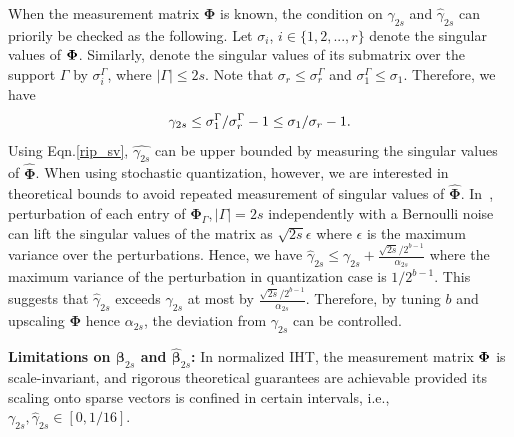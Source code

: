 \documentclass{article}
\begin{document}
When the measurement matrix $\boldsymbol{\Phi}$ is known, the condition on $\gamma_{2s}$ and $\hat{\gamma}_{2s}$ can priorily be checked as the following. Let $\sigma_i$, $i \in \{1, 2, ..., r \}$ denote the singular values of ${\bf \Phi}$. Similarly, denote the singular values of its submatrix over the support ${\Gamma}$ by $\sigma_i^{\Gamma}$, where $|\Gamma|\leq 2s$. Note that $\sigma_r \leq \sigma_r^{\Gamma}$ and $\sigma_1^{\Gamma} \leq \sigma_1$. Therefore, we have
\begin{equation}\label{rip_sv}
\small
    \gamma_{2s} \leq \sigma_1^{\Gamma}/\sigma_r^{\Gamma}-1 \leq \sigma_1/\sigma_r-1.
\end{equation}
Using Eqn.\ref{rip_sv}, $\hat{\gamma_{2s}}$ can be upper bounded
by measuring the singular values of $\hat{\boldsymbol{\Phi}}$. When using stochastic quantization, however, we are interested in theoretical bounds to avoid repeated measurement of singular values of $\hat{\boldsymbol{\Phi}}$. In~\cite{Steawart1990perturbation}, perturbation of each entry of $\boldsymbol{\Phi}_{\Gamma}, |\Gamma|=2s$ independently with a Bernoulli noise can lift the singular values of the matrix as $\sqrt{2s}\epsilon$ where $\epsilon$ is the maximum variance over the perturbations. Hence, we have $\hat{\gamma}_{2s} \leq \gamma_{2s} + \frac{\sqrt{2s}/2^{b-1}}{\alpha_{2s}}$
where the maximum variance of the perturbation in quantization case is $1/2^{b-1}$. This
suggests that $\hat{\gamma}_{2s}$ exceeds $\gamma_{2s}$ at most by $\frac{\sqrt{2s}/2^{b-1}}{\alpha_{2s}}$. Therefore, by tuning $b$ and upscaling $\boldsymbol{\Phi}$ hence $\alpha_{2s}$, the deviation from $\gamma_{2s}$ can be controlled.


{\bf Limitations on ${\boldsymbol{\beta}}_{2s}$ and $\hat{\boldsymbol{\beta}}_{2s}$:} In normalized IHT, the measurement matrix ${\bf \Phi}$ is scale-invariant, and rigorous theoretical guarantees are achievable provided its scaling onto sparse vectors is confined in certain intervals, i.e., ${\gamma}_{2s}, \hat{\gamma}_{2s}\in [0, 1/16]$. 

\end{document}
